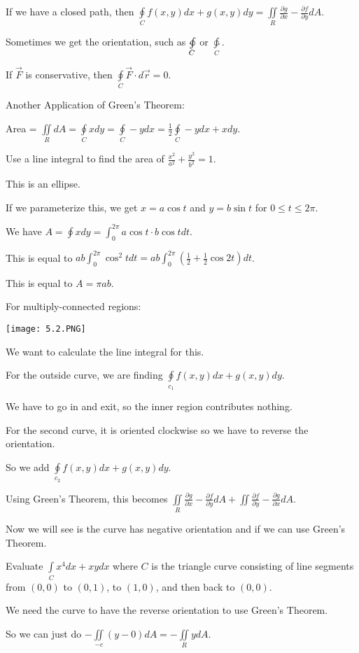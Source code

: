 \documentclass[../calc3.tex]{subfiles}
\begin{document}
If we have a closed path, then $\oint\limits_{C}f(x,y)dx+g(x,y)dy = \iint\limits_{R}\frac{\partial g}{\partial x}-\frac{\partial f}{\partial y}dA$.

Sometimes we get the orientation, such as $\ointclockwise\limits_{C}$ or $\ointctrclockwise\limits_{C}$.

If $\vec{F}$ is conservative, then $\oint\limits_{C}\vec{F}\cdot d\vec{r}=0$.

Another Application of Green's Theorem:

Area = $\iint\limits_{R}dA = \oint\limits_{C}xdy = \oint\limits_{C}-y dx = \frac{1}{2}\oint\limits_{C}-y dx + x dy$.

\begin{example}
    Use a line integral to find the area of $\frac{x^2}{a^2}+\frac{y^2}{b^2}=1$.

    This is an ellipse.

    If we parameterize this, we get $x=a\cos t$ and $y=b\sin t$ for $0\leq t\leq 2\pi$.

    We have $A=\oint x dy = \int_0^{2\pi}a\cos t\cdot b\cos t dt$.

    This is equal to $ab\int_0^{2\pi}\cos^2 t dt = ab\int_0^{2\pi}\left(\frac{1}{2}+\frac{1}{2}\cos 2t\right)dt$.

    This is equal to $A=\pi ab$.
\end{example}

For multiply-connected regions:
\begin{center}
    \texttt{[image: 5.2.PNG]}
\end{center}

We want to calculate the line integral for this.

For the outside curve, we are finding $\oint\limits_{c_1}f(x,y)dx+g(x,y)dy$.

We have to go in and exit, so the inner region contributes nothing.

For the second curve, it is oriented clockwise so we have to reverse the orientation.

So we add $\oint\limits_{c_2}f(x,y)dx+g(x,y)dy$.

Using Green's Theorem, this becomes $\iint\limits_{R}\frac{\partial g}{\partial x}-\frac{\partial f}{\partial y}dA + \iint \frac{\partial f}{\partial y}-\frac{\partial g}{\partial x}dA$.

Now we will see is the curve has negative orientation and if we can use Green's Theorem.
\begin{example}
    Evaluate $\int\limits_{C}x^4 dx + xydx$ where $C$ is the triangle curve consisting of line segments from $(0,0)$ to $(0,1)$, to $(1,0)$, and then back to $(0,0)$.

    We need the curve to have the reverse orientation to use Green's Theorem.

    So we can just do $-\iint\limits_{-c}(y-0)dA = -\iint\limits_{R}ydA$.
\end{example}
\end{document}
